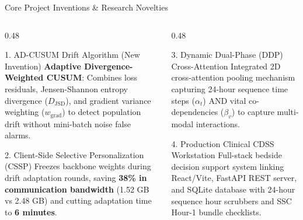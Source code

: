 \documentclass[aspectratio=169, 11pt]{beamer}
\begin{document}
\begin{frame}{Core Project Inventions \& Research Novelties}
    \begin{columns}[t]
        \begin{column}{0.48\textwidth}
            \begin{alertblock}{1. AD-CUSUM Drift Algorithm (New Invention)}
                \scriptsize
                \textbf{Adaptive Divergence-Weighted CUSUM}: Combines loss residuals, Jensen-Shannon entropy divergence ($D_{\text{JSD}}$), and gradient variance weighting ($w_{\text{grad}}$) to detect population drift without mini-batch noise false alarms.
            \end{alertblock}
            
            \begin{alertblock}{2. Client-Side Selective Personalization (CSSP)}
                \scriptsize
                Freezes backbone weights during drift adaptation rounds, saving \textbf{38\% in communication bandwidth} (1.52 GB vs 2.48 GB) and cutting adaptation time to \textbf{6 minutes}.
            \end{alertblock}
        \end{column}
        
        \begin{column}{0.48\textwidth}
            \begin{alertblock}{3. Dynamic Dual-Phase (DDP) Cross-Attention}
                \scriptsize
                Integrated 2D cross-attention pooling mechanism capturing 24-hour sequence time steps ($\alpha_t$) AND vital co-dependencies ($\beta_v$) to capture multi-modal interactions.
            \end{alertblock}

            \begin{alertblock}{4. Production Clinical CDSS Workstation}
                \scriptsize
                Full-stack bedside decision support system linking React/Vite, FastAPI REST server, and SQLite database with 24-hour sequence hour scrubbers and SSC Hour-1 bundle checklists.
            \end{alertblock}
        \end{column}
    \end{columns}
\end{frame}
\end{document}
